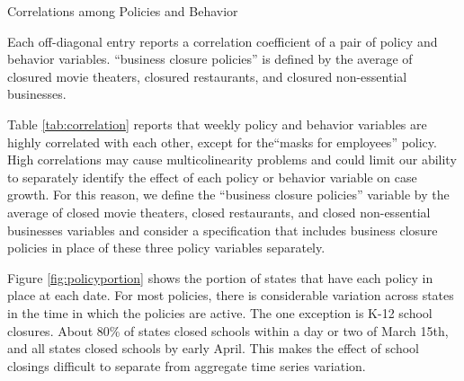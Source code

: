 \documentclass[11pt,reqno,letter]{amsart}
\theoremstyle{definition}
\begin{document}
\begin{table}\caption{Correlations among Policies and Behavior \label{tab:correlation}}\vspace{-0.2cm}
  \begin{minipage}{\linewidth}
    \resizebox{\linewidth}{!}{
      
    }\smallskip
       \begin{flushleft}
         \scriptsize
         Each off-diagonal entry reports a correlation coefficient of
         a pair of policy and behavior variables. ``business closure policies'' is defined by the average of  closured movie theaters, closured restaurants, and closured non-essential businesses.
       \end{flushleft}
  \end{minipage}
\end{table}

Table \ref{tab:correlation} reports that weekly policy and behavior
variables are highly correlated with each other, except for the``masks
for employees'' policy.  High correlations may cause multicolinearity
problems and could limit our ability to separately identify the
effect of each policy or behavior variable on case growth.
For this reason, we define  the ``business closure policies'' variable by the average of closed movie theaters, closed  restaurants, and closed non-essential businesses variables and consider a specification that includes business closure policies   in place of these three policy variables separately.

Figure \ref{fig:policyportion} shows the portion of states that have
each policy in place at each date. For most policies, there is
considerable variation across states in the time in which the policies
are active. The one exception is K-12 school closures. About 80\% of
states closed schools within a day or two of March 15th, and all
states closed schools by early April. This makes the effect of school
closings difficult to separate from aggregate time series variation.
\end{document}
